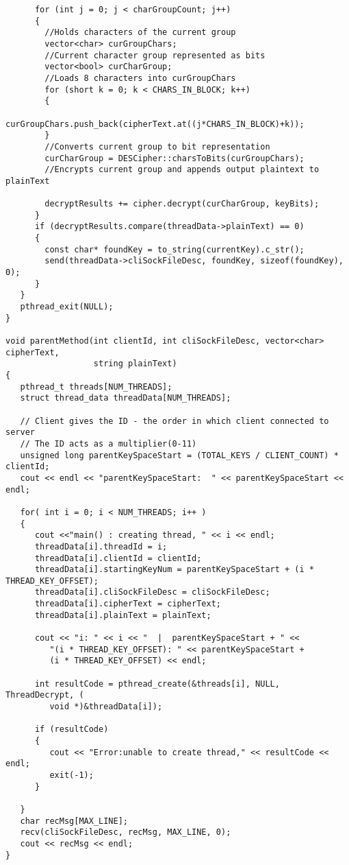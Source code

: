 \documentclass[11pt]{article}
\begin{document}
\begin{verbatim}
      for (int j = 0; j < charGroupCount; j++)
      {
        //Holds characters of the current group
        vector<char> curGroupChars;
        //Current character group represented as bits
        vector<bool> curCharGroup;
        //Loads 8 characters into curGroupChars
        for (short k = 0; k < CHARS_IN_BLOCK; k++)
        {
          curGroupChars.push_back(cipherText.at((j*CHARS_IN_BLOCK)+k));
        }
        //Converts current group to bit representation
        curCharGroup = DESCipher::charsToBits(curGroupChars);
        //Encrypts current group and appends output plaintext to plainText

        decryptResults += cipher.decrypt(curCharGroup, keyBits);
      }
      if (decryptResults.compare(threadData->plainText) == 0)
      {
        const char* foundKey = to_string(currentKey).c_str();
        send(threadData->cliSockFileDesc, foundKey, sizeof(foundKey), 0);
      }
   }
   pthread_exit(NULL);
}

void parentMethod(int clientId, int cliSockFileDesc, vector<char> cipherText,
                  string plainText)
{
   pthread_t threads[NUM_THREADS];
   struct thread_data threadData[NUM_THREADS];

   // Client gives the ID - the order in which client connected to server
   // The ID acts as a multiplier(0-11)
   unsigned long parentKeySpaceStart = (TOTAL_KEYS / CLIENT_COUNT) * clientId;
   cout << endl << "parentKeySpaceStart:  " << parentKeySpaceStart << endl;

   for( int i = 0; i < NUM_THREADS; i++ )
   {
      cout <<"main() : creating thread, " << i << endl;
      threadData[i].threadId = i;
      threadData[i].clientId = clientId;
      threadData[i].startingKeyNum = parentKeySpaceStart + (i * THREAD_KEY_OFFSET);
      threadData[i].cliSockFileDesc = cliSockFileDesc;
      threadData[i].cipherText = cipherText;
      threadData[i].plainText = plainText;

      cout << "i: " << i << "  |  parentKeySpaceStart + " <<
         "(i * THREAD_KEY_OFFSET): " << parentKeySpaceStart +
         (i * THREAD_KEY_OFFSET) << endl;

      int resultCode = pthread_create(&threads[i], NULL, ThreadDecrypt, (
         void *)&threadData[i]);

      if (resultCode)
      {
         cout << "Error:unable to create thread," << resultCode << endl;
         exit(-1);
      }

   }
   char recMsg[MAX_LINE];
   recv(cliSockFileDesc, recMsg, MAX_LINE, 0);
   cout << recMsg << endl;
}


\end{verbatim}
\end{document}
